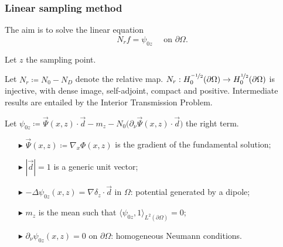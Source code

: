 \documentclass[10pt,xcolor={dvipsnames}]{beamer}
\newenvironment{variableblock}[3]{%
  \setbeamercolor{block body}{#2}
  \setbeamercolor{block title}{#3}
  \begin{block}{#1}}{\end{block}}
\theoremstyle{plain}
\theoremstyle{plain}
\begin{document}
\begin{frame}
  \frametitle{Linear sampling method}
  {\footnotesize
  The aim is to solve the linear equation}
  \begin{equation}
  N_r f = \psi_{0z} \quad \text{ on }\partial \Omega.
  \end{equation}
\begin{block}
 {Let {\color{blue} $z$} the {\color{blue}sampling point}.}
\end{block}

\begin{block}{
Let {\color{blue}${N_r} \coloneqq {N_0} - {N_D}$} denote the 
{\color{blue} relative map}.}
\footnotesize
$N_r:H_0^{\nicefrac{-1}{2}}(\partial \Omega)\to H_0^{\nicefrac{1}{2}}(\partial \Omega)$ 
  is injective, with dense image, self-adjoint, compact and positive. 
  Intermediate results are entailed by the Interior Transmission Problem.
\end{block}
\begin{block}{
  Let $\psi_{0z} \coloneqq \vec{\Psi}(x,z)\cdot\vec{d} - m_z - N_0\bigl(\partial_\nu \vec{\Psi}(x,z) \cdot \vec{d}\bigr)$
  the right term.}
  \footnotesize
 \begin{itemize}
  \item[$\blacktriangleright$] $ \vec{\Psi}(x,z)\coloneqq\nabla_x\Phi(x,z)$ is the gradient of the fundamental solution;\\
  \item[$\blacktriangleright$] $|\vec{d}|=1$ is a generic unit vector;
  \item[$\blacktriangleright$] $-\Delta \psi_{0z}(x,z) = \nabla\delta_{z} \cdot \vec{d}$ in $\Omega$: potential generated by a dipole;\\
  \item[$\blacktriangleright$] $m_z$ is the mean such that $\langle\psi_{0z},1\rangle_{L^2(\partial\Omega)}=0$;
  \item[$\blacktriangleright$] $\partial_\nu\psi_{0z}(x,z) = 0$ on $\partial \Omega$: homogeneous Neumann conditions.\\
  

\end{itemize}
\end{block}
\end{frame}
\end{document}
